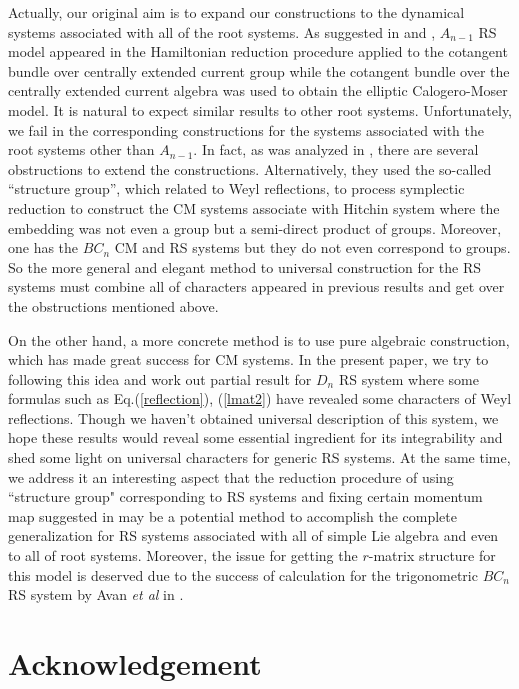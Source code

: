 \documentclass[a4paper,12pt]{article}
\begin{document}
Actually, our original aim is to expand our constructions to
the dynamical systems associated with all of the root systems.
As suggested in \cite{GN95} and \cite{aru}, $A_{n-1}$ RS
model appeared in the Hamiltonian reduction procedure
applied to the cotangent bundle over centrally extended
current group while the cotangent bundle over the
centrally extended current algebra was used to obtain the
elliptic Calogero-Moser model\cite{GN94,AM95}. It is natural
to expect similar results to other root systems.
Unfortunately, we fail in the corresponding constructions for the
systems associated with the root systems other than
$A_{n-1}$. In fact, as was analyzed in \cite{hm}, there are several
obstructions to extend the constructions.
Alternatively, they used the so-called ``structure group'',
which related to  Weyl reflections, to process symplectic
reduction to construct the CM systems associate with Hitchin
system where the embedding was not even a group but a semi-direct
product of groups. Moreover, one has the $BC_n$ CM and RS
systems but they do not even correspond to groups. So the
more general and elegant method to universal construction
for the RS systems must combine all of characters appeared
in previous results and get over the obstructions mentioned
above.

On the other hand, a more concrete method is to use
pure algebraic construction, which has made great success
for CM systems\cite{hp1,bcs,bcs2,bcs3,bcs1}. In the present
paper, we try to following this idea and work out partial
result for $D_{n}$ RS system where some formulas such as
Eq.(\ref{reflection}), (\ref{lmat2}) have revealed some characters
of Weyl reflections. Though we haven't obtained universal description of this system,
we hope these results would reveal some essential
ingredient for its integrability and shed some light on
universal characters for generic RS systems. At the same time, we
address it an interesting aspect that the reduction procedure of using ``structure group" corresponding to
RS systems and fixing certain momentum map
suggested in \cite{N96,hm} may be a potential method to accomplish
the complete generalization for RS systems associated with all of
simple Lie algebra and even to all of root systems.
Moreover, the issue for getting the $r$-matrix structure for
this model is deserved due to the success of calculation for the
trigonometric $BC_{n}$ RS system by Avan \textit{et al} in \cite{Avan}.

\section*{Acknowledgement}
\end{document}
